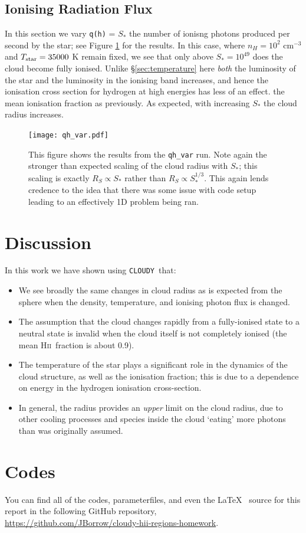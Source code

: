 \documentclass[a4paper]{article}
\newcommand{\hii}{H\textsc{ii}~}
\newcommand{\cloudy}{{\tt CLOUDY}~}
\begin{document}
\subsection{Ionising Radiation Flux}\label{sec:ionising}

In this section we vary {\tt q(h)} = $S_*$ the number of ionisng photons
produced per second by the star; see Figure \ref{fig:qhvar} for the results.
In this case, where $n_H = 10^2$ cm$^{-3}$ and $T_{\rm star} = 35000$ K remain
fixed, we see that only above $S_* = 10^{49}$ does the cloud become fully
ionised. Unlike §\ref{sec:temperature} here \emph{both} the luminosity of the
star and the luminosity in the ionising band increases, and hence the
ionisation cross section for hydrogen at high energies has less of an effect.
the mean ionisation fraction as previously. As expected, with increasing
$S_*$ the cloud radius increases.

\begin{figure}
    \centering
    \texttt{[image: qh\_var.pdf]}
    \caption{This figure shows the results from the {\tt qh\_var} run. Note
        again the stronger than expected scaling of the cloud radius with
        $S_*$; this scaling is exactly $R_S \propto S_*$ rather than
        $R_S \propto S_*^{1/3}$. This again lends credence to the idea that
        there was some issue with code setup leading to an effectively
        1D problem being ran.}
    \label{fig:qhvar}
\end{figure}

\section{Discussion}

In this work we have shown using \cloudy that:
\begin{itemize}
    \item We see broadly the same changes in cloud radius as is expected
          from the \citet{stromgren_physical_1939} sphere when the density,
          temperature, and ionising photon flux is changed.
    \item The assumption that the cloud changes rapidly from a fully-ionised
          state to a neutral state is invalid when the cloud itself is not
          completely ionised (the mean \hii fraction is about 0.9).
    \item The temperature of the star plays a significant role in the dynamics
          of the cloud structure, as well as the ionisation fraction; this is
          due to a dependence on energy in the hydrogen ionisation
          cross-section.
    \item In general, the \citet{stromgren_physical_1939} radius provides an
          \emph{upper} limit on the cloud radius, due to other cooling
          processes and species inside the cloud `eating' more photons than
          was originally assumed.
\end{itemize}

\section{Codes}

You can find all of the codes, parameterfiles, and even the \LaTeX~ source
for this report in the following GitHub repository,\\
\url{https://github.com/JBorrow/cloudy-hii-regions-homework}.


\end{document}
